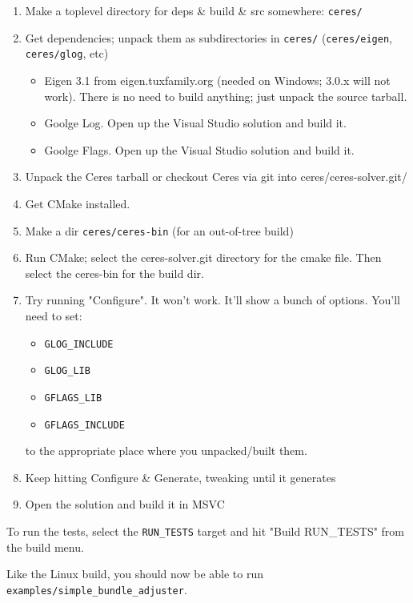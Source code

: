 \begin{enumerate}
  \item Make a toplevel directory for deps \& build \& src somewhere: \texttt{ceres/}
  \item Get dependencies; unpack them as subdirectories in \texttt{ceres/}
        (\texttt{ceres/eigen}, \texttt{ceres/glog}, etc)
  \begin{itemize}
    \item Eigen 3.1 from eigen.tuxfamily.org (needed on Windows; 3.0.x will not
          work). There is no need to build anything; just unpack the source
          tarball.
    \item Goolge Log. Open up the Visual Studio solution and build it.
    \item Goolge Flags. Open up the Visual Studio solution and build it.
  \end{itemize}
  \item Unpack the Ceres tarball or checkout Ceres via git into ceres/ceres-solver.git/
  \item Get CMake installed.
  \item Make a dir \texttt{ceres/ceres-bin} (for an out-of-tree build)
  \item Run CMake; select the ceres-solver.git directory for the cmake file. Then select the ceres-bin for the build dir.
  \item Try running "Configure". It won't work. It'll show a bunch of options. You'll need to set:
    \begin{itemize}
    \item \texttt{GLOG\_INCLUDE}
    \item \texttt{GLOG\_LIB}
    \item \texttt{GFLAGS\_LIB}
    \item \texttt{GFLAGS\_INCLUDE}
    \end{itemize}
    to the appropriate place where you unpacked/built them.
  \item Keep hitting Configure \& Generate, tweaking until it generates
  \item Open the solution and build it in MSVC
\end{enumerate}

To run the tests, select the \texttt{RUN\_TESTS} target and hit "Build RUN\_TESTS" from the build menu.

Like the Linux build, you should now be able to run \texttt{examples/simple\_bundle\_adjuster}.

